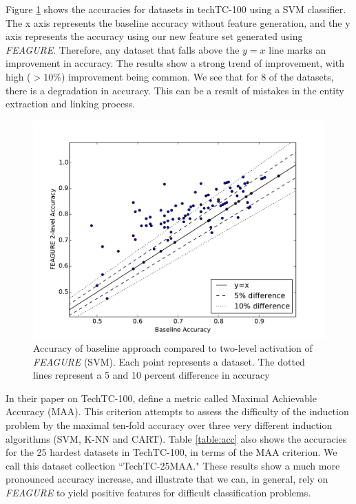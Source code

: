 \documentclass{article}
\theoremstyle{definition}
\begin{document}
Figure \ref{fig:svm_base_lvl2} shows the accuracies for datasets in techTC-100 using a SVM classifier. The x axis represents the baseline accuracy without feature generation, and the y axis represents the accuracy using our new feature set generated using \emph{FEAGURE}. Therefore, any dataset that falls above the $y=x$ line marks an improvement in accuracy. 
The results show a strong trend of improvement, with high ($>10\%$) improvement being common.
We see that for 8 of the datasets, there is a degradation in accuracy. This can be a result of mistakes in the entity extraction and linking process.

\begin{figure}
	\centering
	\includegraphics[width=0.5\linewidth]{svm_full_lvl2}
	\caption{Accuracy of
		baseline approach compared to two-level activation of \emph{FEAGURE} (SVM). Each point represents a dataset. The dotted lines represent a 5 and 10 percent difference in accuracy}
	\label{fig:svm_base_lvl2}
\end{figure}


In their paper on TechTC-100, \cite{gabrilovich2004text} define a metric called Maximal Achievable Accuracy (MAA). This criterion attempts to assess the difficulty of the induction problem by the maximal ten-fold accuracy over three very different induction algorithms (SVM, K-NN and CART).
Table \ref{table:acc} also shows the accuracies for the 25 hardest datasets in TechTC-100, in terms of the MAA criterion. We call this dataset collection ``TechTC-25MAA." 
These results show a much more pronounced accuracy increase, and illustrate that we can, in general, rely on \emph{FEAGURE} to yield positive features for difficult classification problems.
\end{document}
